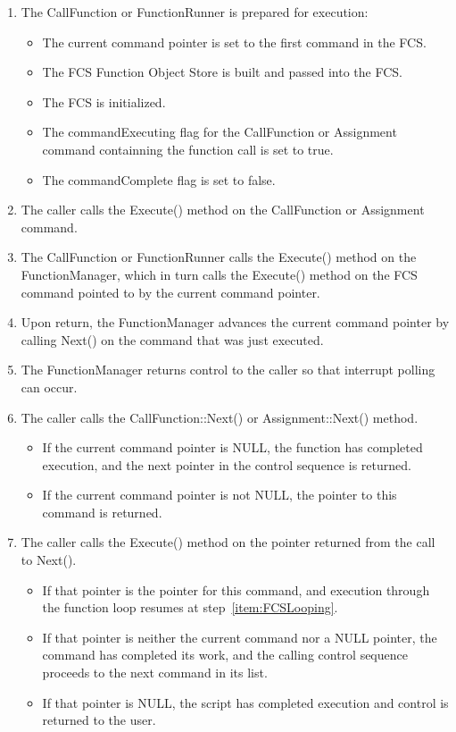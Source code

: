 \begin{enumerate}
\item The CallFunction or FunctionRunner is prepared for execution:
\begin{itemize}
\item The current command pointer is set to the first command in the FCS.
\item The FCS Function Object Store is built and passed into the FCS.
\item The FCS is initialized.
\item The commandExecuting flag for the CallFunction or Assignment command containning the function
call is set to true.
\item The commandComplete flag is set to false.
\end{itemize}
\item The caller calls the Execute() method on the CallFunction or Assignment command.
\item \label{item:FCSLooping}The CallFunction or FunctionRunner calls the Execute() method on the
FunctionManager, which in turn calls the Execute() method on the FCS command pointed to by the
current command pointer.
\item Upon return, the FunctionManager advances the current command pointer by calling Next() on the
command that was just executed.
\item The FunctionManager returns control to the caller so that interrupt polling can occur.
\item The caller calls the CallFunction::Next() or Assignment::Next() method.
\begin{itemize}
\item If the current command pointer is NULL, the function has completed execution, and the next
pointer in the control sequence is returned.
\item If the current command pointer is not NULL, the pointer to this command is returned.
\end{itemize}
\item The caller calls the Execute() method on the pointer returned from the call to Next().
\begin{itemize}
\item If that pointer is the pointer for this command, and execution through the function loop
resumes at step~\ref{item:FCSLooping}.
\item If that pointer is neither the current command nor a NULL pointer, the command has
completed its work, and the calling control sequence proceeds to the next command in its list.
\item If that pointer is NULL, the script has completed execution and control is returned to the
user.
\end{itemize}
\end{enumerate}

